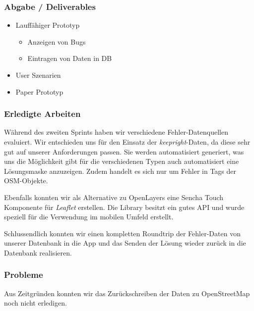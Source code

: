 \subsubsection{Abgabe / Deliverables}

\begin{itemize}
	\item Lauffähiger Prototyp
	\begin{itemize}
		\item Anzeigen von Bugs
		\item Eintragen von Daten in DB
	\end{itemize}
	\item User Szenarien
	\item Paper Prototyp
\end{itemize}

\subsubsection{Erledigte Arbeiten}
Während des zweiten Sprints haben wir verschiedene Fehler-Datenquellen evaluiert. Wir entschieden uns für den Einsatz der \emph{keepright}-Daten, da diese sehr gut auf unserer Anforderungen passen. Sie werden automatisiert generiert, was uns die Möglichkeit gibt für die verschiedenen Typen auch automatisiert eine Lösungsmaske anzuzeigen. Zudem handelt es sich nur um Fehler in Tags der OSM-Objekte.

Ebenfalls konnten wir als Alternative zu OpenLayers eine Sencha Touch Komponente für \emph{Leaflet} erstellen.
Die Library besitzt ein gutes API und wurde speziell für die Verwendung im mobilen Umfeld erstellt.

Schlussendlich konnten wir einen kompletten Roundtrip der Fehler-Daten von unserer Datenbank in die App und das Senden der Lösung wieder zurück in die Datenbank realisieren.

\subsubsection{Probleme}
Aus Zeitgründen konnten wir das Zurückschreiben der Daten zu \gls{OpenStreetMap} noch nicht erledigen.